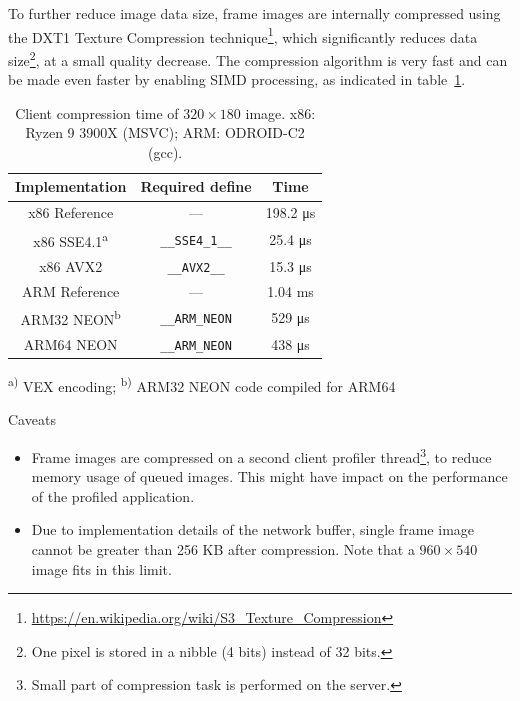 \documentclass[hidelinks,titlepage,a4paper]{article}
\begin{document}
To further reduce image data size, frame images are internally compressed using the DXT1 Texture Compression technique\footnote{\url{https://en.wikipedia.org/wiki/S3_Texture_Compression}}, which significantly reduces data size\footnote{One pixel is stored in a nibble (4 bits) instead of 32 bits.}, at a small quality decrease. The compression algorithm is very fast and can be made even faster by enabling SIMD processing, as indicated in table~\ref{EtcSimd}.

\begin{table}[h]
\centering
\begin{tabular}[h]{c|c|c}
\textbf{Implementation} & \textbf{Required define} & \textbf{Time} \\ \hline
x86 Reference & --- & 198.2 \si{\micro\second} \\
x86 SSE4.1\textsuperscript{a} & \texttt{\_\_SSE4\_1\_\_} & 25.4 \si{\micro\second} \\
x86 AVX2 & \texttt{\_\_AVX2\_\_} & 15.3 \si{\micro\second} \\
ARM Reference & --- & 1.04 \si{\milli\second} \\
ARM32 NEON\textsuperscript{b} & \texttt{\_\_ARM\_NEON} & 529 \si{\micro\second} \\
ARM64 NEON & \texttt{\_\_ARM\_NEON} & 438 \si{\micro\second}
\end{tabular}

\vspace{1em}
\textsuperscript{a)} VEX encoding; \hspace{0.5em} \textsuperscript{b)} ARM32 NEON code compiled for ARM64
\caption{Client compression time of $320\times180$ image. x86: Ryzen 9 3900X (MSVC); ARM: ODROID-C2 (gcc).}
\label{EtcSimd}
\end{table}

\begin{bclogo}[
noborder=true,
couleur=black!5,
logo=\bcattention
]{Caveats}
\begin{itemize}
\item Frame images are compressed on a second client profiler thread\footnote{Small part of compression task is performed on the server.}, to reduce memory usage of queued images. This might have impact on the performance of the profiled application.
\item Due to implementation details of the network buffer, single frame image cannot be greater than 256 KB after compression. Note that a $960\times540$ image fits in this limit.
\end{itemize}
\end{bclogo}
\end{document}
